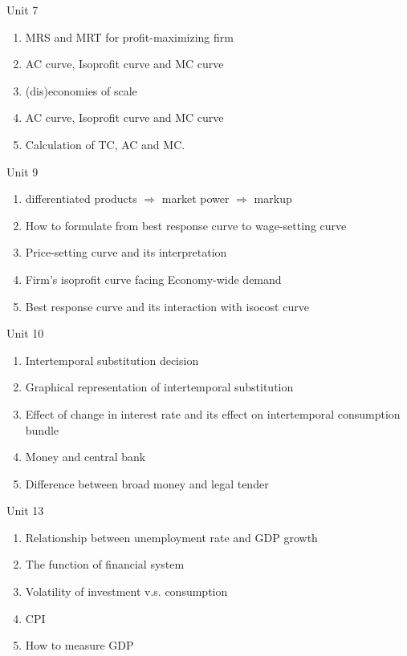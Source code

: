 \documentclass{beamer}
\begin{document}
\begin{frame}{Unit 7}
\label{slide:Unit_7}
    \begin{enumerate}
        \item MRS and MRT for profit-maximizing firm
        \item AC curve, Isoprofit curve and MC curve
        \item (dis)economies of scale
        \item AC curve, Isoprofit curve and MC curve
        \item Calculation of TC, AC and MC.
    \end{enumerate}
\end{frame}



\begin{frame}{Unit 9}
\label{slide:Unit_9}
    \begin{enumerate}
        \item differentiated products $ \Rightarrow  $ market power $ \Rightarrow  $ markup
        \item How to formulate from best response curve to wage-setting curve
        \item Price-setting curve and its interpretation
        \item Firm's isoprofit curve facing Economy-wide demand
        \item Best response curve and its interaction with isocost curve
    \end{enumerate}

\end{frame}

\begin{frame}{Unit 10}
\label{slide:Unit_10}
    \begin{enumerate}
        \item Intertemporal substitution decision
        \item Graphical representation of intertemporal substitution
        \item Effect of change in interest rate and its effect on intertemporal consumption bundle
        \item Money and central bank
        \item Difference between broad money and legal tender
    \end{enumerate}

\end{frame}

\begin{frame}{Unit 13}
\label{slide:Unit_13}
    \begin{enumerate}
        \item Relationship between unemployment rate and GDP growth
        \item The function of financial system
        \item Volatility of investment v.s. consumption
        \item CPI
        \item How to measure GDP
    \end{enumerate}

\end{frame}


\printbibliography[heading=none]
\end{document}
